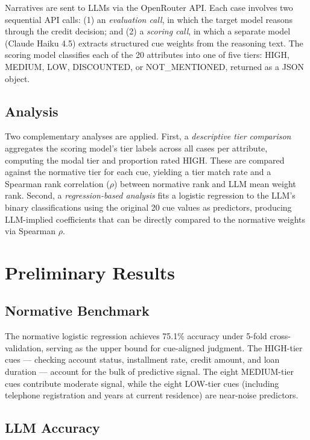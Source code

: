 \documentclass[midterm]{sparreport}
\begin{document}
Narratives are sent to LLMs via the OpenRouter API. Each case involves two sequential API calls: (1) an \textit{evaluation call}, in which the target model reasons through the credit decision; and (2) a \textit{scoring call}, in which a separate model (Claude Haiku 4.5) extracts structured cue weights from the reasoning text. The scoring model classifies each of the 20 attributes into one of five tiers: HIGH, MEDIUM, LOW, DISCOUNTED, or NOT\_MENTIONED, returned as a JSON object.

\subsection{Analysis}

Two complementary analyses are applied. First, a \textit{descriptive tier comparison} aggregates the scoring model's tier labels across all cases per attribute, computing the modal tier and proportion rated HIGH. These are compared against the normative tier for each cue, yielding a tier match rate and a Spearman rank correlation ($\rho$) between normative rank and LLM mean weight rank. Second, a \textit{regression-based analysis} fits a logistic regression to the LLM's binary classifications using the original 20 cue values as predictors, producing LLM-implied coefficients that can be directly compared to the normative weights via Spearman $\rho$.

\section{Preliminary Results}

\subsection{Normative Benchmark}

The normative logistic regression achieves 75.1\% accuracy under 5-fold cross-validation, serving as the upper bound for cue-aligned judgment. The HIGH-tier cues — checking account status, installment rate, credit amount, and loan duration — account for the bulk of predictive signal. The eight MEDIUM-tier cues contribute moderate signal, while the eight LOW-tier cues (including telephone registration and years at current residence) are near-noise predictors.

\subsection{LLM Accuracy}
\end{document}
